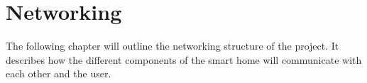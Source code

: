 \chapter{Networking}  \label{sec:networking}
The following chapter will outline the networking structure of 
the project. It describes how the different components of the
smart home will communicate with each other and the user. 





 